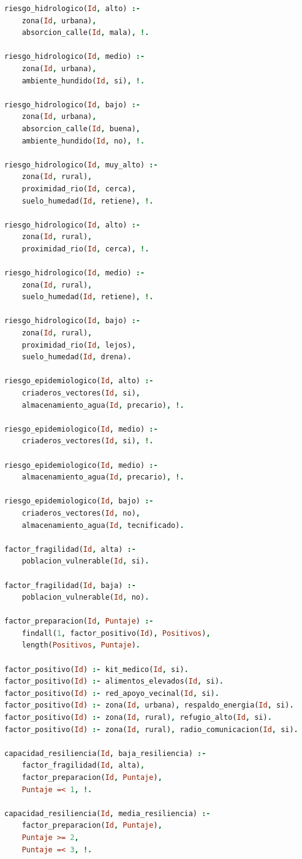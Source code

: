 \documentclass[12pt, letterpaper]{article}
\begin{document}
\begin{lstlisting}[language=Prolog, caption={Código completo del sistema experto}]
riesgo_hidrologico(Id, alto) :-
    zona(Id, urbana),
    absorcion_calle(Id, mala), !.

riesgo_hidrologico(Id, medio) :-
    zona(Id, urbana),
    ambiente_hundido(Id, si), !.

riesgo_hidrologico(Id, bajo) :-
    zona(Id, urbana),
    absorcion_calle(Id, buena),
    ambiente_hundido(Id, no), !.

riesgo_hidrologico(Id, muy_alto) :-
    zona(Id, rural),
    proximidad_rio(Id, cerca),
    suelo_humedad(Id, retiene), !.

riesgo_hidrologico(Id, alto) :-
    zona(Id, rural),
    proximidad_rio(Id, cerca), !.

riesgo_hidrologico(Id, medio) :-
    zona(Id, rural),
    suelo_humedad(Id, retiene), !.

riesgo_hidrologico(Id, bajo) :-
    zona(Id, rural),
    proximidad_rio(Id, lejos),
    suelo_humedad(Id, drena).

riesgo_epidemiologico(Id, alto) :-
    criaderos_vectores(Id, si),
    almacenamiento_agua(Id, precario), !.

riesgo_epidemiologico(Id, medio) :-
    criaderos_vectores(Id, si), !.

riesgo_epidemiologico(Id, medio) :-
    almacenamiento_agua(Id, precario), !.

riesgo_epidemiologico(Id, bajo) :-
    criaderos_vectores(Id, no),
    almacenamiento_agua(Id, tecnificado).

factor_fragilidad(Id, alta) :-
    poblacion_vulnerable(Id, si).

factor_fragilidad(Id, baja) :-
    poblacion_vulnerable(Id, no).

factor_preparacion(Id, Puntaje) :-
    findall(1, factor_positivo(Id), Positivos),
    length(Positivos, Puntaje).

factor_positivo(Id) :- kit_medico(Id, si).
factor_positivo(Id) :- alimentos_elevados(Id, si).
factor_positivo(Id) :- red_apoyo_vecinal(Id, si).
factor_positivo(Id) :- zona(Id, urbana), respaldo_energia(Id, si).
factor_positivo(Id) :- zona(Id, rural), refugio_alto(Id, si).
factor_positivo(Id) :- zona(Id, rural), radio_comunicacion(Id, si).

capacidad_resiliencia(Id, baja_resiliencia) :-
    factor_fragilidad(Id, alta),
    factor_preparacion(Id, Puntaje),
    Puntaje =< 1, !.

capacidad_resiliencia(Id, media_resiliencia) :-
    factor_preparacion(Id, Puntaje),
    Puntaje >= 2,
    Puntaje =< 3, !.


\end{lstlisting}
\end{document}
